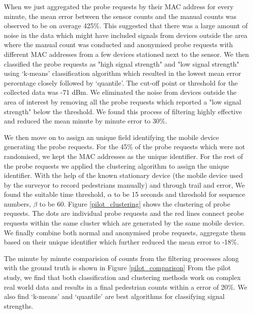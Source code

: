 When we just aggregated the probe requests by their MAC address for every minute, the mean error between the sensor counts and the manual counts was observed to be on average 425\%.
This suggested that there was a large amount of noise in the data which might have included signals from devices outside the area where the manual count was conducted and anonymised probe requests with different MAC addresses from a few devices stationed next to the sensor.
We then classified the probe requests as "high signal strength" and "low signal strength" using `k-means' classification algorithm which resulted in the lowest mean error percentage closely followed by `quantile'.
The cut-off point or threshold for the collected data was -71 dBm.
We eliminated the noise from devices outside the area of interest by removing all the probe requests which reported a "low signal strength" below the threshold.
We found this process of filtering highly effective and reduced the mean minute by minute error to 30\%.

We then move on to assign an unique field identifying the mobile device generating the probe requests.
For the 45\% of the probe requests which were not randomised, we kept the MAC addresses as the unique identifier.
For the rest of the probe requests we applied the clustering algorithm to assign the unique identifier.
With the help of the known stationary device (the mobile device used by the surveyor to record pedestrians manually) and through trail and error, We found the suitable time threshold, $\alpha$ to be 15 seconds and threshold for sequence numbers, $\beta$ to be 60.
Figure \ref{pilot_clustering} shows the clustering of probe requests.
The dots are individual probe requests and the red lines connect probe requests within the same cluster which are generated by the same mobile device.
We finally combine both normal and anonymised probe requests, aggregate them based on their unique identifier which further reduced the mean error to -18\%.

The minute by minute comparision of counts from the filtering processes along with the ground truth is shown in Figure \ref{pilot_comparison} From the pilot study, we find that both classification and clustering methods work on complex real world data and results in a final pedestrian counts within a error of 20\%.
We also find `k-means' and `quantile' are best algorithms for classifying signal strengths.


